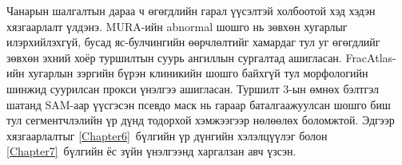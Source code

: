 Чанарын шалгалтын дараа ч өгөгдлийн гарал үүсэлтэй холбоотой хэд хэдэн хязгаарлалт үлдэнэ. MURA-ийн abnormal шошго нь зөвхөн хугарлыг илэрхийлэхгүй, бусад яс-булчингийн өөрчлөлтийг хамардаг тул уг өгөгдлийг зөвхөн эхний хоёр туршилтын суурь ангиллын сургалтад ашигласан. FracAtlas-ийн хугарлын зэргийн бүрэн клиникийн шошго байхгүй тул морфологийн шинжид суурилсан прокси үнэлгээ ашигласан. Туршилт 3-ын өмнөх бэлтгэл шатанд SAM-аар үүсгэсэн псевдо маск нь гараар баталгаажуулсан шошго биш тул сегментчлэлийн үр дүнд тодорхой хэмжээгээр нөлөөлөх боломжтой. Эдгээр хязгаарлалтыг \ref{Chapter6}~бүлгийн үр дүнгийн хэлэлцүүлэг болон \ref{Chapter7}~бүлгийн ёс зүйн үнэлгээнд харгалзан авч үзсэн.
